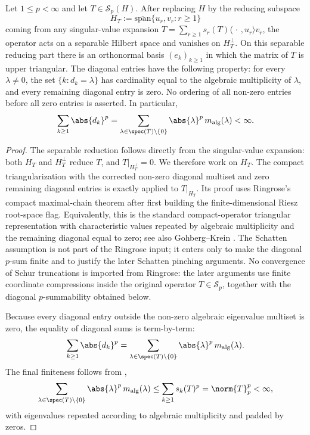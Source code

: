 \begin{lemma}
  \label{lem:ringrose-prescribed-diagonal}
  Let \(1\le p<\infty\) and let \(T\in\mathcal S_p(H)\). After replacing \(H\)
  by the reducing subspace
  \[
    H_T:=\overline{\mathrm{span}}\{u_r,v_r:r\ge1\}
  \]
  coming from any singular-value expansion
  \(T=\sum_{r\ge1}s_r(T)\langle\,\cdot\,,u_r\rangle v_r\), the operator
  acts on a separable Hilbert space and vanishes on \(H_T^\perp\).
  On this separable reducing part there is an orthonormal basis
  \((e_k)_{k\ge1}\) in which the matrix of \(T\) is upper triangular. The
  diagonal entries have the following property: for every \(\lambda\ne0\),
  the set \(\{k:d_k=\lambda\}\) has cardinality equal to the algebraic
  multiplicity of \(\lambda\), and every remaining diagonal entry is zero.
  No ordering of all non-zero entries before all zero entries is asserted.
  In particular,
  \[
    \sum_{k\ge1}\abs{d_k}^p
    =
    \sum_{\lambda\in\spec(T)\setminus\{0\}}
      \abs{\lambda}^p\,m_{\mathrm{alg}}(\lambda)
    <\infty .
  \]
\end{lemma}

\begin{proof}
  The separable reduction follows directly from the singular-value
  expansion: both \(H_T\) and \(H_T^\perp\) reduce \(T\), and
  \(T|_{H_T^\perp}=0\). We therefore work on \(H_T\). The compact
  triangularization with the corrected non-zero diagonal multiset and zero
  remaining diagonal entries is exactly
   applied to
  \(T|_{H_T}\). Its proof uses Ringrose's compact maximal-chain theorem
  \cite[Chapter~1, Theorem~3, pp.~6--8]{Ringrose1971CompactNonSelfAdjoint}
  after first building the finite-dimensional Riesz root-space flag.
  Equivalently, this is the standard compact-operator triangular representation
  with characteristic values repeated by algebraic multiplicity and the remaining
  diagonal equal to zero; see also Gohberg--Krein
  \cite[pp.~162--163]{GohbergKrein1969NonSelfAdjoint}. The Schatten assumption is not part of the Ringrose input;
  it enters only to make the diagonal \(p\)-sum finite and to justify the
  later Schatten pinching arguments. No convergence of Schur truncations is
  imported from Ringrose: the later arguments use finite coordinate
  compressions inside the original operator \(T\in\mathcal S_p\), together
  with the diagonal \(p\)-summability obtained below.

  Because every diagonal entry outside the non-zero algebraic eigenvalue
  multiset is zero, the equality of diagonal sums is term-by-term:
  \[
    \sum_{k\ge1}\abs{d_k}^p
    =
    \sum_{\lambda\in\spec(T)\setminus\{0\}}
      \abs{\lambda}^p\,m_{\mathrm{alg}}(\lambda).
  \]
  The final finiteness follows from ,
  \[
    \sum_{\lambda\in\spec(T)\setminus\{0\}}
      \abs{\lambda}^p\,m_{\mathrm{alg}}(\lambda)
    \le
    \sum_{k\ge1}s_k(T)^p
    =
    \norm{T}_p^p<\infty,
  \]
  with eigenvalues repeated according to algebraic multiplicity and padded
  by zeros.
\end{proof}

